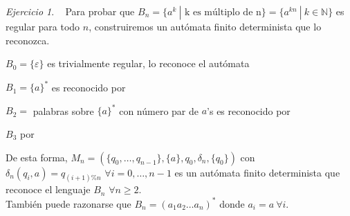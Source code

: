\documentclass[12pt,spanish]{article}
\theoremstyle{definition}
\theoremstyle{remark}
\newtheorem{exercise}{Ejercicio}%
\begin{document}
\begin{exercise}~ Para probar que
  $B_n=\{a^k \ | \text{ k es múltiplo de n}\}=\{a^{kn} \ | \ k \in
  \mathbb{N}\}$ es regular para todo $n$, construiremos un autómata
  finito determinista que lo reconozca.

  $B_0=\{\varepsilon\}$ es trivialmente regular, lo reconoce el autómata \vspace{-5mm}
\begin{figure}[H]
  \centering
\end{figure} \vspace{-5mm}
$B_1=\{a\}^*$ es reconocido por \vspace{-7mm}
\begin{figure}[H]
  \centering
\end{figure}
$B_2=$ palabras sobre $\{a\}^*$ con número par de $a$'s es reconocido por
\begin{figure}[H]
  \centering
\end{figure}

$B_3$ por 
\begin{figure}[H]
  \centering
\end{figure}

De esta forma,
$M_n=(\{q_0,\ldots,q_{n-1}\},\{a\},q_0,\delta_n,\{q_0\})$ con
\\ $\delta_n(q_i,a)=q_{(i+1)\%n}$ $\forall i=0,\ldots,n-1$ es un
autómata finito determinista que reconoce el lenguaje $B_n$
$\forall n\geq 2$. \\

También puede razonarse que $B_n=(a_1a_2\ldots a_n)^*$ donde
$a_i=a \ \forall i$.
\end{exercise}
\end{document}
